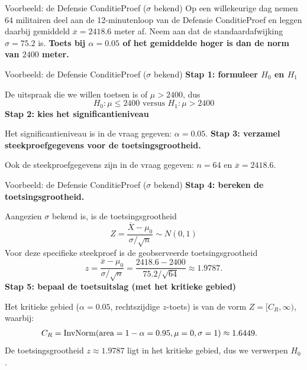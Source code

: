     \begin{frame}{Voorbeeld: de Defensie ConditieProef ($\sigma$ bekend)}
        Op een willekeurige dag nemen $64$ militairen deel aan de 12-minutenloop van de Defensie ConditieProef
        en leggen daarbij gemiddeld $\overline{x}=2418.6$ meter af.
        Neem aan dat de standaardafwijking $\sigma = 75.2$ is.
        \vfill
        \textbf{Toets bij $\alpha = 0.05$ of het gemiddelde hoger is dan de norm van $2400$ meter.}
    \end{frame}

    \begin{frame}{Voorbeeld: de Defensie ConditieProef ($\sigma$ bekend)}
        \textbf{Stap 1: formuleer $H_0$ en $H_1$}

        De uitspraak die we willen toetsen is of $\mu > 2400$, dus
        \[
            H_0: \mu \leq 2400 \text{ versus } H_1: \mu > 2400
        \]
        \vfill\pause
        \textbf{Stap 2: kies het significantieniveau}

        Het significantieniveau is in de vraag gegeven: $\alpha = 0.05$.
        \vfill\pause
        \textbf{Stap 3: verzamel steekproefgegevens voor de toetsingsgrootheid.}

        Ook de steekproefgegevens zijn in de vraag gegeven: $n = 64$ en $\overline{x} = 2418.6$.
    \end{frame}

    \begin{frame}{Voorbeeld: de Defensie ConditieProef ($\sigma$ bekend)}
        \textbf{Stap 4: bereken de toetsingsgrootheid.}

        Aangezien $\sigma$ bekend is, is de toetsingsgrootheid
        \[
            Z = \frac{\overline{X} - \mu_0}{\sigma / \sqrt{n}} \sim N(0,1)
        \]
        Voor deze specifieke steekproef is de geobserveerde toetsingsgrootheid 
        \[
            z = \frac{\overline{x} - \mu_0}{\sigma / \sqrt{n}} = \frac{2418.6 - 2400}{75.2 / \sqrt{64}} \approx 1.9787.
        \]
        \textbf{Stap 5: bepaal de toetsuitslag (met het kritieke gebied)}

        Het kritieke gebied ($\alpha = 0.05$, rechtszijdige $z$-toets) is van de vorm $Z = [C_R, \infty)$, waarbij:
        \begin{align*}
            C_R &= \operatorname{InvNorm}(\text{area}=1-\alpha = 0.95, \mu=0, \sigma=1) \approx 1.6449.
        \end{align*}
        De toetsingsgrootheid $z \approx 1.9787$ ligt in het kritieke gebied, dus we verwerpen $H_0$.
    \end{frame}

